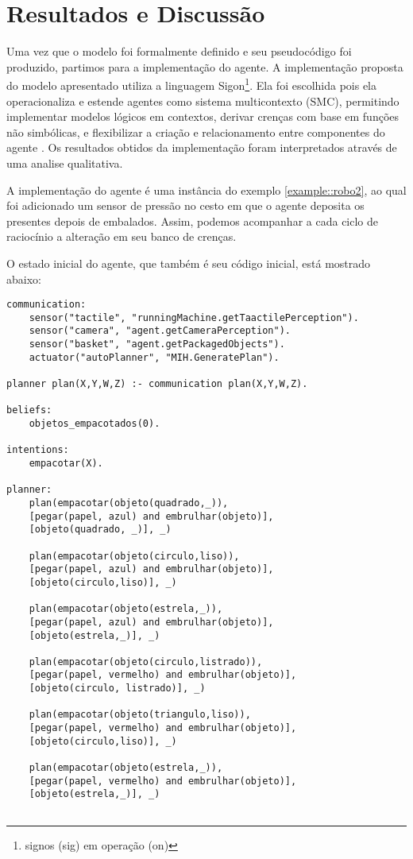 \chapter{Resultados e Discussão}

\noindent Uma vez que o modelo foi formalmente definido e seu pseudocódigo foi produzido, partimos para a implementação do agente. 
A implementação proposta do modelo apresentado utiliza a linguagem Sigon\footnote{signos (sig) em operação (on)}.
Ela foi escolhida pois ela operacionaliza e estende agentes como sistema multicontexto (SMC), permitindo implementar modelos lógicos em contextos, derivar crenças com base em funções não simbólicas,
e flexibilizar a criação e relacionamento entre componentes do agente \cite{gelaim2019sigon}.
Os resultados obtidos da implementação foram interpretados através de uma analise qualitativa.

A implementação do agente é uma instância do exemplo \ref{example::robo2}, ao qual foi adicionado um sensor de pressão no cesto em que o agente deposita os presentes depois de embalados. Assim, podemos acompanhar a cada ciclo de raciocínio a alteração em seu banco de crenças.

O estado inicial do agente, que também é seu código inicial, está mostrado abaixo:

\begin{lstlisting}[caption={Estado inicial do agente Sigon.},label={list:total}]
communication:
    sensor("tactile", "runningMachine.getTaactilePerception").
    sensor("camera", "agent.getCameraPerception").
    sensor("basket", "agent.getPackagedObjects").
    actuator("autoPlanner", "MIH.GeneratePlan").

planner plan(X,Y,W,Z) :- communication plan(X,Y,W,Z).

beliefs:
    objetos_empacotados(0).
    
intentions:
	empacotar(X).

planner:
	plan(empacotar(objeto(quadrado,_)),
	[pegar(papel, azul) and embrulhar(objeto)],
	[objeto(quadrado, _)], _)

	plan(empacotar(objeto(circulo,liso)),
	[pegar(papel, azul) and embrulhar(objeto)],
	[objeto(circulo,liso)], _)

	plan(empacotar(objeto(estrela,_)),
	[pegar(papel, azul) and embrulhar(objeto)],
	[objeto(estrela,_)], _)

	plan(empacotar(objeto(circulo,listrado)),
	[pegar(papel, vermelho) and embrulhar(objeto)],
	[objeto(circulo, listrado)], _)

	plan(empacotar(objeto(triangulo,liso)),
	[pegar(papel, vermelho) and embrulhar(objeto)],
	[objeto(circulo,liso)], _)

	plan(empacotar(objeto(estrela,_)),
	[pegar(papel, vermelho) and embrulhar(objeto)],
	[objeto(estrela,_)], _)


\end{lstlisting}


